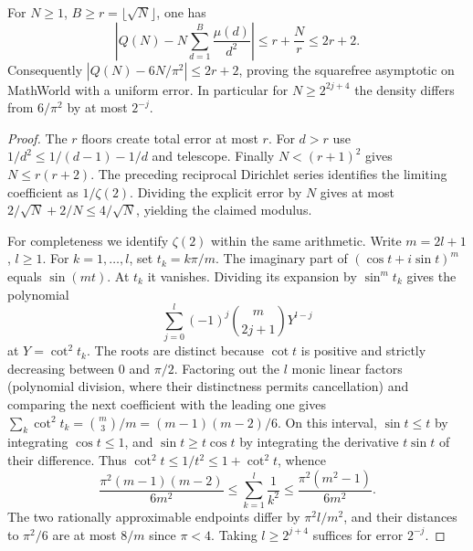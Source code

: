 \begin{theorem}
For $N\ge1$, $B\ge r=\lfloor\sqrt N\rfloor$, one has
\[
 \left|Q(N)-N\sum_{d=1}^B\frac{\mu(d)}{d^2}\right|
        \le r+\frac{N}{r}\le 2r+2.
\]
Consequently $|Q(N)-6N/\pi^2|\le2r+2$, proving the squarefree
asymptotic on MathWorld with a uniform error. In particular for
$N\ge2^{2j+4}$ the density differs from $6/\pi^2$ by at most
$2^{-j}$.
\end{theorem}
\begin{proof}
The $r$ floors create total error at most $r$. For $d>r$ use
$1/d^2\le 1/(d-1)-1/d$ and telescope. Finally
$N<(r+1)^2$ gives $N\le r(r+2)$. The preceding reciprocal
Dirichlet series identifies the limiting coefficient as $1/\zeta(2)$.
Dividing the explicit error by $N$ gives at most
$2/\sqrt N+2/N\le4/\sqrt N$, yielding the claimed modulus.

For completeness we identify $\zeta(2)$ within the same arithmetic.
Write $m=2l+1$, $l\ge1$. For $k=1,\ldots,l$, set $t_k=k\pi/m$.
The imaginary part of $(\cos t+i\sin t)^m$ equals $\sin(mt)$.
At $t_k$ it vanishes. Dividing its expansion by $\sin^m t_k$
gives the polynomial
\[
        \sum_{j=0}^l(-1)^j {m\choose 2j+1}Y^{l-j}
\]
at $Y=\cot^2 t_k$. The roots are distinct because $\cot t$ is
positive and strictly decreasing between $0$ and $\pi/2$.
Factoring out the $l$ monic linear factors (polynomial division, where
their distinctness permits cancellation) and comparing the next
coefficient with the leading one gives
$\sum_k \cot^2t_k={m\choose3}/m=(m-1)(m-2)/6$. On this interval,
$\sin t\le t$ by integrating $\cos t\le1$, and
$\sin t\ge t\cos t$ by integrating the derivative $t\sin t$ of
their difference. Thus $\cot^2t\le1/t^2\le1+\cot^2t$, whence
\[
 \frac{\pi^2(m-1)(m-2)}{6m^2}\le
        \sum_{k=1}^l\frac1{k^2}
          \le \frac{\pi^2(m^2-1)}{6m^2}.
\]
The two rationally approximable endpoints differ by $\pi^2l/m^2$,
and their distances to $\pi^2/6$ are at most $8/m$ since $\pi<4$.
Taking $l\ge 2^{j+4}$ suffices for error $2^{-j}$.


\end{proof}
